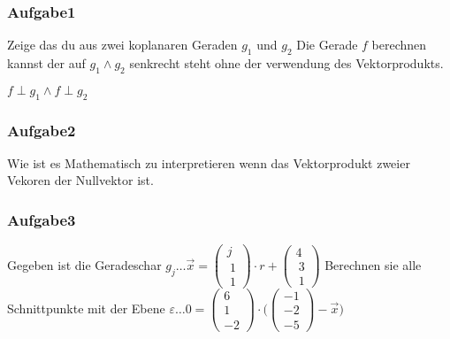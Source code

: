 \documentclass{article}
\begin{document}
\subsubsection*{Aufgabe1}

Zeige das du aus zwei koplanaren Geraden \( g_1 \) und \(g_2\) Die Gerade \( f \) berechnen kannst der auf \( g_1  \land g_2 \) senkrecht steht ohne der verwendung des Vektorprodukts.

\( f \perp g_1 \land f \perp g_2 \) 


\subsubsection*{Aufgabe2}
Wie ist es Mathematisch zu interpretieren wenn das Vektorprodukt zweier Vekoren der Nullvektor ist.

\subsubsection*{Aufgabe3}

Gegeben ist die Geradeschar \( g_j \dots \overrightarrow{x} = \begin{pmatrix}
	j \\\ 1 \\\ 1
\end{pmatrix} \cdot r + \begin{pmatrix}
4 \\\ 3 \\\ 1
\end{pmatrix} \) Berechnen sie alle Schnittpunkte mit der Ebene \newline \( \varepsilon \dots 0 = \begin{pmatrix}
	6\\1\\-2
\end{pmatrix} \cdot \bigg( \begin{pmatrix}
	-1\\-2\\-5
\end{pmatrix} - \overrightarrow{x} \bigg) \)
\end{document}
